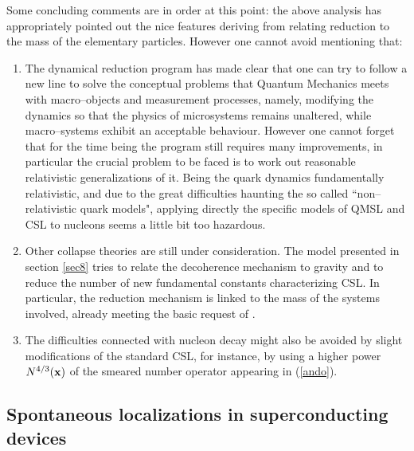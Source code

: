 \documentclass[10pt,a4paper]{article}
\begin{document}
Some concluding comments are in order at this point: the above
analysis has appropriately pointed out the nice features deriving
from relating reduction to the mass of the elementary particles.
However one cannot avoid mentioning that:
\begin{enumerate}
\item The dynamical reduction program has made clear that one can
try to follow a new line to solve the conceptual problems that
Quantum Mechanics meets with macro--objects and measurement
processes, namely, modifying the dynamics so that the physics of
microsystems remains unaltered, while macro--systems exhibit an
acceptable behaviour. However one cannot forget that for the time
being the program still requires many improvements, in particular
the crucial problem to be faced is to work out reasonable
relativistic generalizations of it. Being the quark dynamics
fundamentally relativistic, and due to the great difficulties
haunting the so called ``non--relativistic quark models",
applying directly the specific models of QMSL and CSL to nucleons
seems a little bit too hazardous. \item Other collapse theories
are still under consideration. The model presented in section
\ref{sec8} tries to relate the decoherence mechanism to gravity
and to reduce the number of new fundamental constants
characterizing CSL. In particular, the reduction mechanism is
linked to the mass of the systems involved, already meeting the
basic request of \cite{pes}. \item The difficulties connected with
nucleon decay might also be avoided by slight modifications of the
standard CSL, for instance, by using a higher power $N^{4/3}({\bf
x})$ of the smeared number operator appearing in (\ref{ando}).
\end{enumerate}

\subsection[Superconducting devices]{Spontaneous localizations
in superconducting devices} \label{sec154}
\end{document}

